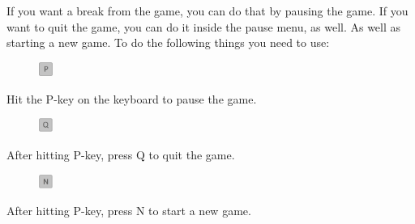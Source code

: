 \documentclass[../master.tex]{subfile}
\begin{document}
If you want a break from the game, you can do that by pausing the game. If you want to quit the game, you can do it inside the pause menu, as well. As well as starting a new game. To do the following things you need to use:\\
\begin{figure}
	\vspace{-6.6mm}
	\begin{centering}
		\includegraphics[width=0.04\textwidth]{./Pictures/Pause.png}
	\end{centering}
	\vspace{-6mm}
\end{figure}
Hit the P-key on the keyboard to pause the game.\\

\begin{figure}
	\vspace{-6.9mm}
	\begin{centering}
		\includegraphics[width=0.04\textwidth]{./Pictures/Quit.png}
	\end{centering}
	\vspace{-6mm}
\end{figure}
After hitting P-key, press Q to quit the game.\\

\begin{figure}
	\vspace{-6.9mm}
	\begin{centering}
		\includegraphics[width=0.04\textwidth]{./Pictures/New_Game.png}
	\end{centering}
	\vspace{-6mm}
\end{figure}
After hitting P-key, press N to start a new game.\\

\newpage
\end{document}

